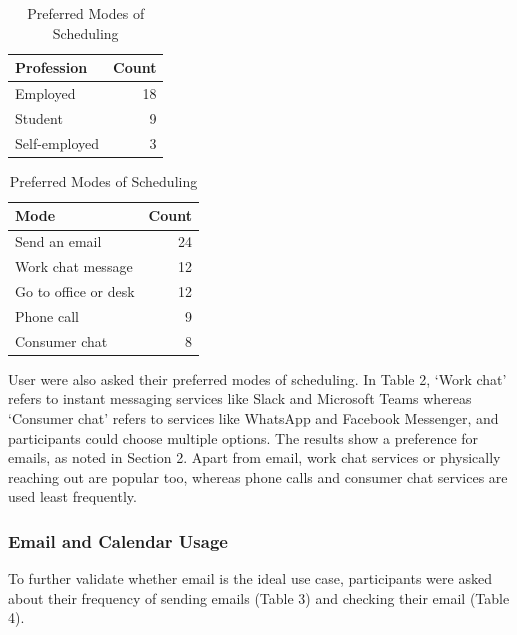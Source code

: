 \documentclass{article}
\begin{document}
\begin{table}[!htb]
	\begin{minipage}{.5\linewidth}
		\caption{Professions of Participants}
		\centering
		\begin{tabular}{lr}
			\hline
			\textbf{Profession} & \textbf{Count} \\
			\hline
			Employed            & 18             \\
			Student             & 9              \\
			Self-employed       & 3              \\
			\hline
		\end{tabular}
	\end{minipage}%
	\hspace{.1cm}
	\begin{minipage}{.5\linewidth}
		\centering
		\caption{Preferred Modes of Scheduling}
		\begin{tabular}{lr}
			\hline
			\textbf{Mode}        & \textbf{Count} \\
			\hline
			Send an email        & 24             \\
			Work chat message    & 12             \\
			Go to office or desk & 12             \\
			Phone call           & 9              \\
			Consumer chat        & 8              \\
			\hline
		\end{tabular}
	\end{minipage}
\end{table}

User were also asked their preferred modes of scheduling. In Table 2, `Work chat' refers to instant messaging services like Slack and Microsoft Teams whereas `Consumer chat' refers to services like WhatsApp and Facebook Messenger, and participants could choose multiple options. The results show a preference for emails, as noted in Section 2. Apart from email, work chat services or physically reaching out are popular too, whereas phone calls and consumer chat services are used least frequently.

\subsubsection{Email and Calendar Usage}

To further validate whether email is the ideal use case, participants were asked about their frequency of sending emails (Table 3) and checking their email (Table 4).
\end{document}
